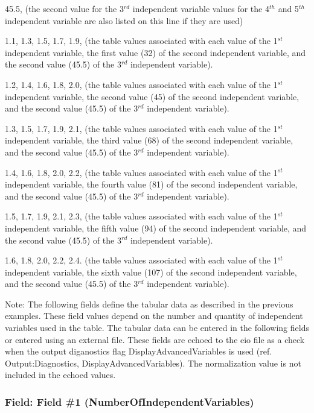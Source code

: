 45.5, (the second value for the 3\(^{rd}\) independent variable values for the 4\(^{th}\) and 5\(^{th}\) independent variable are also listed on this line if they are used)

1.1, 1.3, 1.5, 1.7, 1.9, (the table values associated with each value of the 1\(^{st}\) independent variable, the first value (32) of the second independent variable, and the second value (45.5) of the 3\(^{rd}\) independent variable).

1.2, 1.4, 1.6, 1.8, 2.0, (the table values associated with each value of the 1\(^{st}\) independent variable, the second value (45) of the second independent variable, and the second value (45.5) of the 3\(^{rd}\) independent variable).

1.3, 1.5, 1.7, 1.9, 2.1, (the table values associated with each value of the 1\(^{st}\) independent variable, the third value (68) of the second independent variable, and the second value (45.5) of the 3\(^{rd}\) independent variable).

1.4, 1.6, 1.8, 2.0, 2.2, (the table values associated with each value of the 1\(^{st}\) independent variable, the fourth value (81) of the second independent variable, and the second value (45.5) of the 3\(^{rd}\) independent variable).

1.5, 1.7, 1.9, 2.1, 2.3, (the table values associated with each value of the 1\(^{st}\) independent variable, the fifth value (94) of the second independent variable, and the second value (45.5) of the 3\(^{rd}\) independent variable).

1.6, 1.8, 2.0, 2.2, 2.4. (the table values associated with each value of the 1\(^{st}\) independent variable, the sixth value (107) of the second independent variable, and the second value (45.5) of the 3\(^{rd}\) independent variable).

Note: The following fields define the tabular data as described in the previous examples. These field values depend on the number and quantity of independent variables used in the table. The tabular data can be entered in the following fields or entered using an external file. These fields are echoed to the eio file as a check when the output diganostics flag DisplayAdvancedVariables is used (ref. Output:Diagnostics, DisplayAdvancedVariables). The normalization value is not included in the echoed values.

\subsubsection{Field: Field \#1 (NumberOfIndependentVariables)}\label{field-field-1-numberofindependentvariables}

